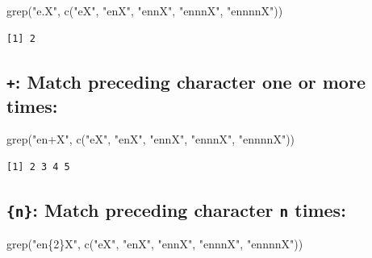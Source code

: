 \documentclass[
]{book}
\newenvironment{Shaded}{\begin{snugshade}}{\end{snugshade}}
\newcommand{\FunctionTok}[1]{\textcolor[rgb]{0.00,0.00,0.00}{#1}}
\newcommand{\NormalTok}[1]{#1}
\newcommand{\StringTok}[1]{\textcolor[rgb]{0.31,0.60,0.02}{#1}}
\begin{document}
\begin{Shaded}
\begin{Highlighting}[]
\FunctionTok{grep}\NormalTok{(}\StringTok{"e.X"}\NormalTok{, }\FunctionTok{c}\NormalTok{(}\StringTok{"eX"}\NormalTok{, }\StringTok{"enX"}\NormalTok{, }\StringTok{"ennX"}\NormalTok{, }\StringTok{"ennnX"}\NormalTok{, }\StringTok{"ennnnX"}\NormalTok{))}
\end{Highlighting}
\end{Shaded}

\begin{verbatim}
[1] 2
\end{verbatim}

\hypertarget{match-preceding-character-one-or-more-times}{%
\subsection{\texorpdfstring{\texttt{+}: Match preceding character one or more times:}{+: Match preceding character one or more times:}}\label{match-preceding-character-one-or-more-times}}

\begin{Shaded}
\begin{Highlighting}[]
\FunctionTok{grep}\NormalTok{(}\StringTok{"en+X"}\NormalTok{, }\FunctionTok{c}\NormalTok{(}\StringTok{"eX"}\NormalTok{, }\StringTok{"enX"}\NormalTok{, }\StringTok{"ennX"}\NormalTok{, }\StringTok{"ennnX"}\NormalTok{, }\StringTok{"ennnnX"}\NormalTok{))}
\end{Highlighting}
\end{Shaded}

\begin{verbatim}
[1] 2 3 4 5
\end{verbatim}

\hypertarget{n-match-preceding-character-n-times}{%
\subsection{\texorpdfstring{\texttt{\{n\}}: Match preceding character \texttt{n} times:}{\{n\}: Match preceding character n times:}}\label{n-match-preceding-character-n-times}}

\begin{Shaded}
\begin{Highlighting}[]
\FunctionTok{grep}\NormalTok{(}\StringTok{"en\{2\}X"}\NormalTok{, }\FunctionTok{c}\NormalTok{(}\StringTok{"eX"}\NormalTok{, }\StringTok{"enX"}\NormalTok{, }\StringTok{"ennX"}\NormalTok{, }\StringTok{"ennnX"}\NormalTok{, }\StringTok{"ennnnX"}\NormalTok{))}
\end{Highlighting}
\end{Shaded}
\end{document}
